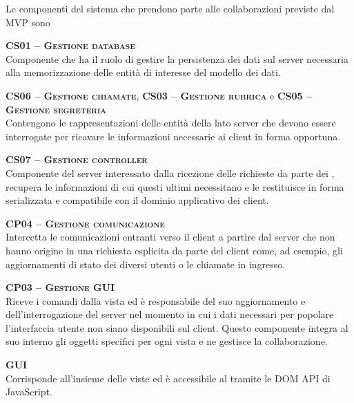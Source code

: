 Le componenti del sistema che prendono parte alle collaborazioni previste dal  MVP sono
\begin{description}
  \item{\scshape\bfseries CS01 -- Gestione database}\\
Componente che ha il ruolo di gestire la persistenza dei dati sul server necessaria alla memorizzazione delle entità di interesse del modello dei dati.

  \item{\textsc{\bfseries CS06 -- Gestione chiamate}, \textsc{\bfseries CS03 -- Gestione rubrica} e \textsc{\bfseries CS05 -- Gestione segreteria}}\\
Contengono le rappresentazioni delle entità della  lato server che devono essere interrogate per ricavare le informazioni necessarie ai client in forma opportuna.

  \item{\scshape\bfseries CS07 -- Gestione controller}\\
Componente del server interessato dalla ricezione delle richieste da parte dei , recupera le informazioni di cui questi ultimi necessitano e le restituisce in forma serializzata e compatibile con il dominio applicativo dei client.

  \item{\scshape\bfseries CP04 -- Gestione comunicazione}\\
Intercetta le comunicazioni entranti verso il client a partire dal server che non hanno origine in una richiesta esplicita da parte del client come, ad esempio, gli aggiornamenti di stato dei diversi utenti o le chiamate in ingresso.
  
  \item{\scshape\bfseries CP03 -- Gestione GUI}\\
Riceve i comandi dalla vista ed è responsabile del suo aggiornamento e dell'interrogazione del server nel momento in cui i dati necessari per popolare l'interfaccia utente non siano disponibili sul client. Questo componente integra al suo interno gli oggetti  specifici per ogni vista e ne gestisce la collaborazione.

  \item{\scshape\bfseries GUI}\\
Corrisponde all'insieme delle viste ed è accessibile al  tramite le DOM API di JavaScript.
\end{description}

